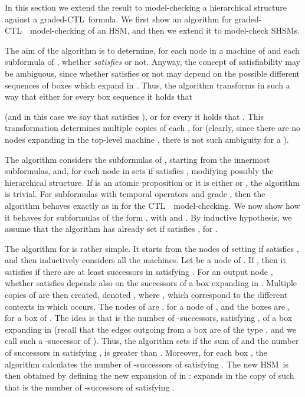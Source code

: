 \documentclass[letterpaper,twocolumn,10pt]{article}
\def    \ctl        {\mbox{\textsc{CTL }\xspace}}
\newcommand{\VHSM}{SHSM}
\newcommand{\HSM}{HSM}
\begin{document}
In this section we extend the result to  model-checking a hierarchical structure against a graded-\ctl\-formula.
We first show an algorithm for graded-\ctl\ model-checking  of an \HSM, and then
we  extend it to model-check \VHSM s.

The aim of the algorithm is to determine, for each node  in a machine
 of  and each subformula  of , whether   \emph{satisfies}   or not.
Anyway, the concept of satisfiability  may be  ambiguous, since  whether
  satisfies   or not  may depend on the possible different sequences of boxes
which expand in . Thus, the algorithm transforms  in such a way that
either  for every  box sequence  it holds that

(and in this case we say that  satisfies ), or for every   it holds that
.
This transformation determines multiple copies of each  , for 
(clearly, since there are no nodes expanding in the top-level machine ,   there
is not such ambiguity for a ).

The algorithm considers the subformulas    of , starting from the innermost subformulas, and,
for each node  in    sets  if  satisfies , modifying possibly the hierarchical
structure.
If  is an atomic proposition or it is either   or , the algorithm is trivial.
For subformulas with temporal operators and grade , then the algorithm behaves exactly as in \cite{AY01} for
the \ctl\ model-checking.
We now show how it behaves for subformulas of the form , with 
and  . By inductive hypothesis, we assume that
the algorithm has already set  if  satisfies , for .


The algorithm for    is rather simple.
It starts from the nodes of  setting
 if  satisfies , and  then inductively considers  all the machines.
Let  be a node  of .
If  , then it
satisfies  if there are at least  successors in  satisfying .
For an output  node , whether  satisfies   depends also on the successors of a box expanding in .
Multiple copies of  are then created, denoted , where  ,
which correspond  to the different contexts in which  occurs.
The  nodes  of   are   , for a node   of ,  and the boxes are , for a box 
of .
The idea is that  is the number of  -successors,
satisfying ,  of a box expanding in 
(recall that the edges outgoing from a box  are of the type , and we call such 
a -successor of ).
Thus,  the algorithm sets  if the sum of  and the number of successors in  satisfying ,
is greater than .
Moreover, for each box , the algorithm calculates   the number of  -successors of  satisfying  .
 The new \HSM\ is then obtained by defining the new expansion of   in :
 expands in the copy   of  such that
 is  the number of  -successors of  satisfying  .
\end{document}

